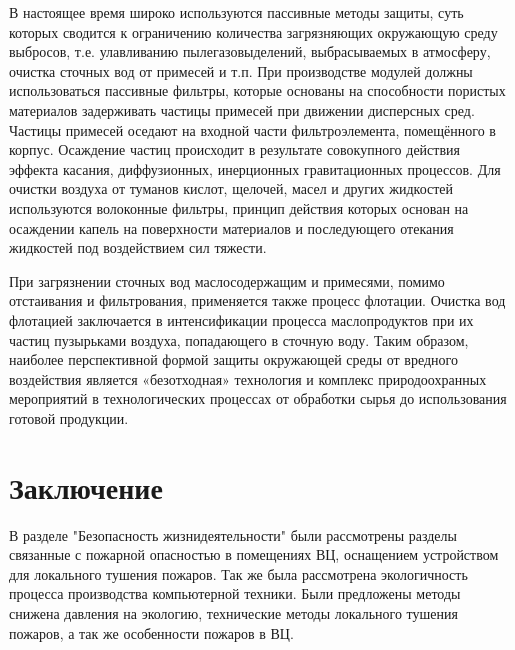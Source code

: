 В настоящее время широко используются пассивные методы защиты, суть которых сводится к ограничению количества
загрязняющих окружающую среду выбросов, т.е. улавливанию пылегазовыделений, выбрасываемых в атмосферу, очистка
сточных вод от примесей и т.п. При производстве модулей должны использоваться пассивные фильтры, которые основаны
на способности пористых материалов задерживать частицы примесей при движении дисперсных сред. Частицы примесей оседают
на входной части фильтроэлемента, помещённого в корпус. Осаждение частиц происходит в результате совокупного действия
эффекта касания, диффузионных, инерционных гравитационных процессов. Для очистки воздуха от туманов кислот, щелочей,
масел и других жидкостей используются волоконные фильтры, принцип действия которых основан на осаждении капель на
поверхности материалов и последующего отекания жидкостей под воздействием сил тяжести.

При загрязнении сточных вод маслосодержащим и примесями, помимо отстаивания и фильтрования, применяется также
процесс флотации. Очистка вод флотацией заключается в интенсификации процесса маслопродуктов при их частиц
пузырьками воздуха, попадающего в сточную воду. Таким образом, наиболее перспективной формой защиты окружающей
среды от вредного воздействия является «безотходная» технология и комплекс природоохранных мероприятий в
технологических процессах от обработки сырья до использования готовой продукции.

\newpage

\section*{Заключение}
В разделе "Безопасность жизнидеятельности" были рассмотрены разделы связанные с пожарной опасностью в помещениях ВЦ,
оснащением устройством для локального тушения пожаров. Так же была рассмотрена экологичность процесса производства 
компьютерной техники. Были предложены методы снижена давления на экологию, технические методы локального
тушения пожаров, а так же особенности пожаров в ВЦ.

\newpage
